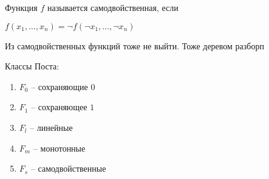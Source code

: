 \documentclass{book}
\theoremstyle{definition}
\begin{document}
    \begin{definition}
        Функция $f$ называется самодвойственная, если

        $f(x_1, \ldots, x_{n} ) = \neg f(\neg x_1, \ldots, \neg x_{n} )$ 
    \end{definition}
        
    \begin{statement}
        Из самодвойственных функций тоже не выйти. Тоже деревом разборп
    \end{statement}
    Классы Поста:
    \begin{enumerate}
        \item $F_0$ -- сохраняющие $0$
        \item $F_1$ -- сохраняющее $1$
        \item $F_l$ -- линейные
        \item $F_m$ -- монотонные
        \item $F_s$ -- самодвойственные
    \end{enumerate}
\end{document}
